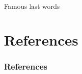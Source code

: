\documentclass[10pt]{beamer}
\begin{document}
\begin{frame}
 \Huge Famous last words
\end{frame}



\section{References}
    \begin{frame}[allowframebreaks]
      \frametitle{References}
      \begin{tiny}
      \nocite{*}
      \printbibliography
      \end{tiny}
    \end{frame}

 
\end{document}
